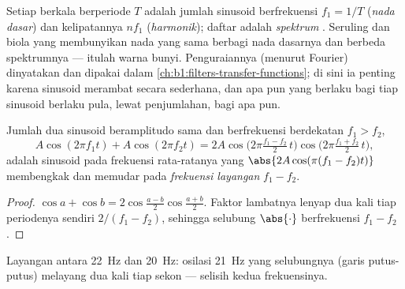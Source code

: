 \begin{remark}[Spektrum]\label{rem:b1:wave-propagation:spectrum}
Setiap  berkala berperiode $T$ adalah jumlah sinusoid berfrekuensi
$f_1 = 1/T$ (\emph{nada dasar}) dan kelipatannya $nf_1$
(\emph{harmonik}); daftar  adalah \emph{spektrum} .
Seruling dan biola yang membunyikan nada yang sama berbagi nada dasarnya
dan berbeda spektrumnya --- itulah warna bunyi. Penguraiannya (menurut
Fourier) dinyatakan dan dipakai dalam
\cref{ch:b1:filters-transfer-functions}; di sini ia penting karena
sinusoid merambat secara sederhana, dan apa pun yang berlaku bagi tiap
sinusoid berlaku pula, lewat penjumlahan, bagi  apa pun.
\end{remark}

\begin{proposition}[Layangan]\label{prop:b1:wave-propagation:beats}
Jumlah dua sinusoid beramplitudo sama dan berfrekuensi berdekatan
$f_1 > f_2$,
\[
A\cos(2\pi f_1 t) + A\cos(2\pi f_2 t)
= 2A\cos\!\big(2\pi\tfrac{f_1 - f_2}{2}\,t\big)\cos\!\big(2\pi\tfrac{f_1 + f_2}{2}\,t\big),
\]
adalah sinusoid pada frekuensi rata-ratanya yang 
$\abs{2A\cos(\pi(f_1 - f_2)t)}$ membengkak dan memudar pada
\emph{frekuensi layangan} $f_1 - f_2$.
\end{proposition}

\begin{proof}
$\cos a + \cos b = 2\cos\frac{a - b}{2}\cos\frac{a + b}{2}$. Faktor
lambatnya lenyap dua kali tiap periodenya sendiri $2/(f_1 - f_2)$,
sehingga selubung $\abs{\cdot}$ berfrekuensi $f_1 - f_2$.
\end{proof}

\begin{omfigure}

{\small Layangan antara \qty{22}{Hz} dan \qty{20}{Hz}: osilasi
\qty{21}{Hz} yang selubungnya (garis putus-putus) melayang dua kali tiap
sekon --- selisih kedua frekuensinya.}
\end{omfigure}

